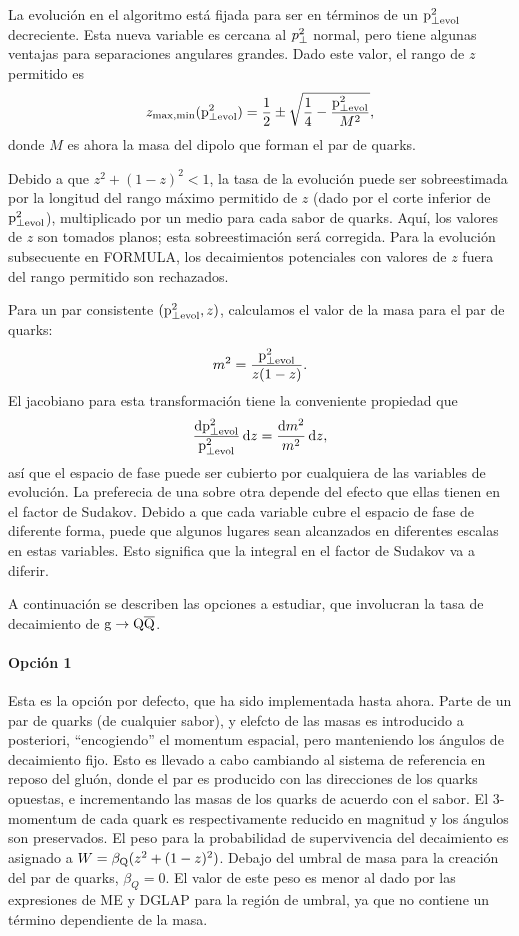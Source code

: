 \documentclass[a4paper,12pt]{article}
\begin{document}
La evolución en el algoritmo está fijada para ser en términos de un ${\mathrm p}^2_{\perp\mathrm{evol}}$ decreciente. Esta nueva variable es cercana al $p^2_{\perp}$ normal, pero tiene algunas ventajas para separaciones angulares grandes. Dado este valor, el rango de $z$ permitido es
\begin{equation}
z_{\mathrm{max,min}}({\mathrm p}^2_{\perp\mathrm{evol}}) = \frac{1}{2} \pm \sqrt{ \frac{1}{4}
 - \frac{{\mathrm p}^2_{\perp\mathrm{evol}}}{M^2}},
\end{equation}
donde $M$ es ahora la masa del dipolo que forman el par de quarks.

Debido a que $z^2+(1-z)^2<1$, la tasa de la evolución puede ser sobreestimada por la longitud del rango máximo permitido de $z$ (dado por el corte inferior de ${\mathrm p}^2_{\perp\mathrm{evol}}$), multiplicado por un medio para cada sabor de quarks. Aquí, los valores de $z$ son tomados planos; esta sobreestimación será corregida. Para la evolución subsecuente en FORMULA, los decaimientos potenciales con valores de $z$ fuera del rango permitido son rechazados.

Para un par consistente $({\mathrm p}^2_{\perp\mathrm{evol}},z)$, calculamos el valor de la masa para el par de quarks:
\begin{equation}
m^2 = \frac{{\mathrm p}^2_{\perp\mathrm{evol}}}{z(1-z)}.
\end{equation}
El jacobiano para esta transformación tiene la conveniente propiedad que
\begin{equation}
\frac{{\mathrm d}{\mathrm p}^2_{\perp\mathrm{evol}}}{{\mathrm p}^2_{\perp\mathrm{evol}}} \, {\mathrm d} z = \frac{{\mathrm d} m^2}{m^2} \, {\mathrm d} z,
\label{jacobian}
\end{equation}
así que el espacio de fase puede ser cubierto por cualquiera de las variables de evolución. La preferecia de una sobre otra depende del efecto que ellas tienen en el factor de Sudakov. Debido a que cada variable cubre el espacio de fase de diferente forma, puede que algunos lugares sean alcanzados en diferentes escalas en estas variables. Esto significa que la integral en el factor de Sudakov va a diferir.

A continuación se describen las opciones a estudiar, que involucran la tasa de decaimiento de ${\mathrm g}\to{\mathrm Q}\overline{\mathrm Q}$.

\paragraph{Opción 1}

Esta es la opción por defecto, que ha sido implementada hasta ahora. Parte de un par de quarks (de cualquier sabor), y elefcto de las masas es introducido a posteriori, ``encogiendo'' el momentum espacial, pero manteniendo los ángulos de decaimiento fijo. Esto es llevado a cabo cambiando al sistema de referencia en reposo del gluón, donde el par es producido con las direcciones de los quarks opuestas, e incrementando las masas de los quarks de acuerdo con el sabor. El 3-momentum de cada quark es respectivamente reducido en magnitud y los ángulos son preservados. El peso para la probabilidad de supervivencia del decaimiento es asignado a $W=\beta_{\mathrm Q}(z^2+(1-z)^2)$. Debajo del umbral de masa para la creación del par de quarks, $\beta_Q=0$. El valor de este peso es menor al dado por las expresiones de ME y DGLAP para la región de umbral, ya que no contiene un término dependiente de la masa.
\end{document}
